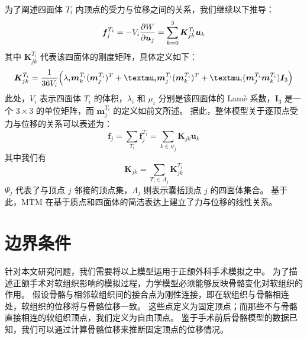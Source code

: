 为了阐述四面体 $T_i$ 内顶点的受力与位移之间的关系，我们继续以下推导：
\begin{equation}
  \bm{f}_j^{T_i}
  = - V_i \pdv{W}{\bm{u}_j}
  = \sum_{k = 0}^3 \bm{K}_{jk}^{T_i} \bm{u}_k
\end{equation}
其中 $\bm{K}_{jk}^{T_i}$ 代表该四面体的刚度矩阵，具体定义如下：
\begin{equation}
  \bm{K}_{jk}^{T_i} = \frac{1}{36 V_i} \pqty{\lambda_i \bm{m}_k^{T_i} (\bm{m}_j^{T_i})^T + \mu_i \bm{m}_j^{T_i} (\bm{m}_k^{T_i})^T + \mu_i (\bm{m}_j^{T_i} \bm{m}_k^{T_i}) \bm{I}_3}
\end{equation}
此处，$V_i$ 表示四面体 $T_i$ 的体积，$\lambda_i$ 和 $\mu_i$ 分别是该四面体的 Lam\`e 系数，$\bm{I}_3$ 是一个 $3 \times 3$ 的单位矩阵，而 $\bm{m}_j^{T_i}$ 的定义如前文所述。
据此，整体模型关于逐顶点受力与位移的关系可以表述为：
\begin{equation}
  \bm{f}_j
  = \sum_{T_i} \bm{f}_j^{T_i}
  = \sum_{k \in \psi_j} \bm{K}_{jk} \bm{u}_k
\end{equation}
其中我们有
\begin{equation}
  \bm{K}_{jk} = \sum_{T_i \in \Lambda_j} \bm{K}_{jk}^{T_i}
\end{equation}
$\Psi_j$ 代表了与顶点 $j$ 邻接的顶点集，$\Lambda_j$ 则表示囊括顶点 $j$ 的四面体集合。
基于此，MTM 在基于质点和四面体的简洁表达上建立了力与位移的线性关系。

\section{边界条件}

针对本文研究问题，我们需要将以上模型运用于正颌外科手术模拟之中。
为了描述正颌手术对软组织影响的模拟过程，力学模型必须能够反映骨骼变化对软组织的作用。
假设骨骼与相邻软组织间的接合点为刚性连接，即在软组织与骨骼相连处，软组织的位移将与骨骼位移一致。
这些点定义为固定顶点；而那些不与骨骼直接相连的软组织顶点，我们定义为自由顶点。
鉴于手术前后骨骼模型的数据已知，我们可以通过计算骨骼位移来推断固定顶点的位移情况。


